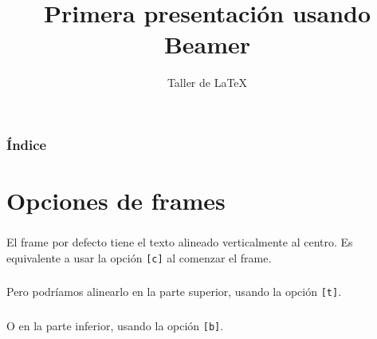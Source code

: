 \documentclass[11pt]{beamer}	%
\title{Primera presentación usando Beamer}
\author{Taller de \LaTeX}
\begin{document}
\frame{\titlepage}




\begin{frame}
	\frametitle{Índice}
	\tableofcontents
\end{frame}

\section{Opciones de frames}
\begin{frame}
	\frametitle{\secname}
	
	El frame por defecto tiene el texto alineado verticalmente al centro. Es equivalente a usar la opción \texttt{[c]} al comenzar el frame.
\end{frame}

\begin{frame}[t]
	\frametitle{\secname}
	
	Pero podríamos alinearlo en la parte superior, usando la opción \texttt{[t]}.
	
\end{frame}

\begin{frame}[b]
	\frametitle{\secname}
	
	O en la parte inferior, usando la opción \texttt{[b]}.
	
\end{frame}
\end{document}
